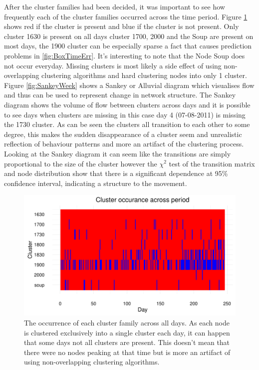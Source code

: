 After the cluster families had been decided, it was important to see how frequently each of the cluster families occurred across the time period. Figure \ref{fig:Clusterocurrance} shows red if the cluster is present and blue if the cluster is not present. Only cluster 1630 is present on all days cluster 1700, 2000 and the Soup are present on most days, the 1900 cluster can be especially sparse a fact that causes prediction problems in \ref{fig:BoxTimeErr}. It's interesting to note that the Node Soup does not occur everyday. Missing clusters is most likely a side effect of using non-overlapping clustering algorithms and hard clustering nodes into only 1 cluster. 
Figure \ref{fig:SankeyWeek} shows a Sankey or Alluvial diagram \cite{sankeydiagrams} \cite{rosvall2010} which visualises flow and thus can be used to represent change in network structure. The Sankey diagram shows the volume of flow between clusters across days and it is possible to see days when clusters are missing in this case day 4 (07-08-2011) is missing the 1730 cluster. As can be seen the clusters all transition to each other to some degree, this makes the sudden disappearance of a cluster seem and unrealistic reflection of behaviour patterns and more an artifact of the clustering process. Looking at the Sankey diagram it can seem like the transitions are simply proportional to the size of the cluster however the $\chi ^2$ test of the transition matrix and node distribution show that there is a significant dependence at 95\% confidence interval, indicating a structure to the movement.

\begin{figure}
    \centering
    \includegraphics[width=\textwidth]{Figures/Results/Clusterocurrance}
    \caption[Cluster Occurance]{The occurrence of each cluster family across all days. As each node is clustered exclusively into a single cluster each day, it can happen that some days not all clusters are present. This doesn't mean that there were no nodes peaking at that time but is more an artifact of using non-overlapping clustering algorithms.}
    \label{fig:Clusterocurrance}
\end{figure}


